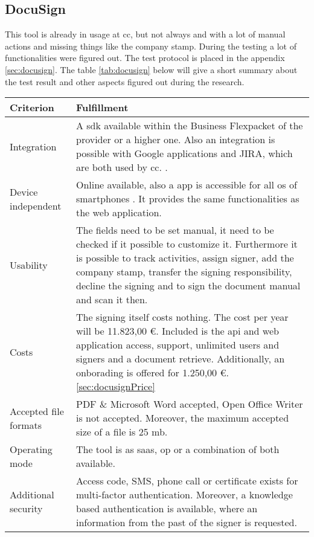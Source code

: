 \subsection{DocuSign}
This tool is already in usage at \gls{cc}, but not always and with a lot of manual actions and missing things like the company stamp. During the testing a lot of functionalities were figured out. The test protocol is placed in the appendix \ref{sec:docusign}. The table \ref{tab:docusign} below will give a short summary about the test result and other aspects figured out during the research.

\begin{table}[h!]
	
	\begin{tabular}{|p{4cm}|p{10cm}|} \hline
		Criterion & Fulfillment \\ \hline
		Integration &  A \gls{sdk} available within the \grqq Business Flex\grqq packet of the provider or a higher one. Also an integration is possible with Google applications and JIRA, which are both used by \gls{cc}. \parencite{docusign2018integration,docusign2018formats,docusign2018google,docusign2018jira}. \\ \hline
		Device independent & Online available, also a \gls{app} is accessible for all \gls{os} of smartphones \parencite{docusign2018mobile}. It provides the same functionalities as the web application. \\ \hline
		Usability &  The fields need to be set manual, it need to be checked if it possible to customize it. Furthermore it is possible to track activities, assign signer, add the company stamp, transfer the signing responsibility, decline the signing and to sign the document manual and scan it then. \\ \hline
		Costs & The signing itself costs nothing. The cost per year will be 11.823,00 \euro. Included is the \gls{api} and web application access, support, unlimited users and signers and a document retrieve. Additionally, an onborading is offered for 1.250,00 \euro. \ref{sec:docusignPrice} \\ \hline
		Accepted file formats & PDF \& Microsoft Word accepted, Open Office Writer is not accepted. Moreover, the maximum accepted size of a file is 25 \gls{mb}. \parencite{docusign2018formats}\\ \hline
		Operating mode & The tool is as \gls{saas}, \gls{op} or a combination of both available. \parencite{docusign2018op,docusign2018saas} \\ \hline
		Additional security & Access code, SMS, phone call or certificate exists for multi-factor authentication. Moreover, a knowledge based authentication is available, where an information from the past of the signer is requested. \parencite{docusign2018security} \\ \hline

\end{tabular}
\end{table}

